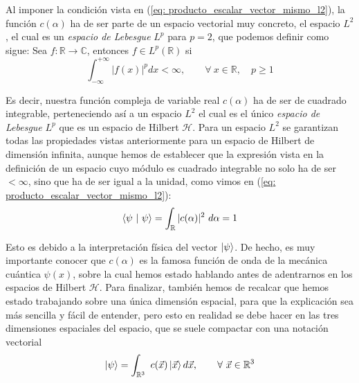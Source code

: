 \documentclass[12pt]{article}
\numberwithin{equation}{section} %
\begin{document}
    \vspace{5mm}

    Al imponer la condición vista en (\ref{eq: producto_escalar_vector_mismo_l2}), la función \( c(\alpha) \) ha de ser parte de un espacio vectorial muy concreto, el espacio \( L^{2} \), el cual es un \textit{espacio de Lebesgue} \( L^{p} \) para \( p = 2 \), que podemos definir como sigue: Sea \( f: \mathbb{R} \rightarrow \mathbb{C} \), entonces \( f \in L^{p} (\mathbb{R}) \) si
    \begin{equation}
        \int_{-\infty}^{+\infty} | f (x) | ^ {p} d x < \infty, \qquad \forall \ x \in \mathbb{R}, \quad p \geq 1
    \end{equation}

    \vspace{2.5mm}

    Es decir, nuestra función compleja de variable real \( c(\alpha) \) ha de ser de cuadrado integrable, perteneciendo así a un espacio \( L^{2} \) el cual es el único \textit{espacio de Lebesgue} \( L^{p} \) que es un espacio de Hilbert \( \mathcal{H} \). Para un espacio \( L^{2} \) se garantizan todas las propiedades vistas anteriormente para un espacio de Hilbert de dimensión infinita, aunque hemos de establecer que la expresión vista en la definición de un espacio cuyo módulo es cuadrado integrable no solo ha de ser \( < \infty \), sino que ha de ser igual a la unidad, como vimos en (\ref{eq: producto_escalar_vector_mismo_l2}):
    \begin{equation*}
        \braket{\psi \ | \ \psi} =  \int_{\mathbb{R}} | c (\alpha) | ^ {2} \ d \alpha = 1
    \end{equation*}

    \vspace{2.5mm}

    Esto es debido a la interpretación física del vector \( \ket{\psi} \). De hecho, es muy importante conocer que \( c(\alpha) \) es la famosa función de onda de la mecánica cuántica \( \psi(x) \), sobre la cual hemos estado hablando antes de adentrarnos en los espacios de Hilbert \( \mathcal{H} \). Para finalizar, también hemos de recalcar que hemos estado trabajando sobre una única dimensión espacial, para que la explicación sea más sencilla y fácil de entender, pero esto en realidad se debe hacer en las tres dimensiones espaciales del espacio, que se suele compactar con una notación vectorial
    \begin{equation*}
        \ket{\psi} = \int_{\mathbb{R}^{3}} \ c(\vec{x}) \ket{\vec{x}} d \vec{x}, \qquad \forall \ \vec{x} \in \mathbb{R}^{3}
    \end{equation*}
\end{document}
